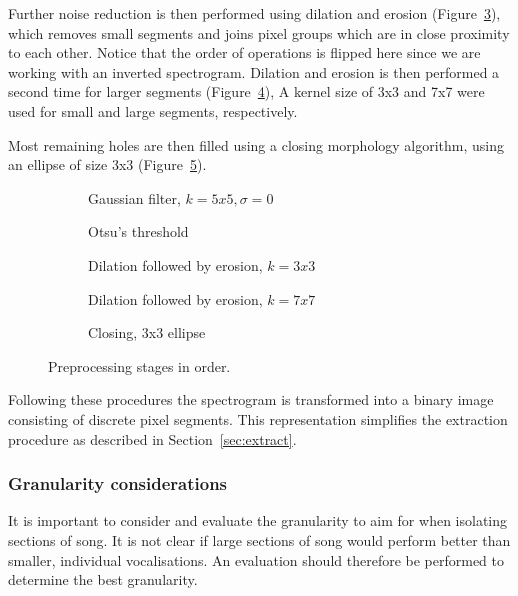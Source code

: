 Further noise reduction is then performed using dilation and erosion
(Figure~\ref{fig:preproc_vis_dilation1}),
which removes small segments and joins pixel groups which are in close proximity
to each other.
Notice that the order of operations is flipped here since we are working with
an inverted spectrogram.
Dilation and erosion is then performed a second time for larger segments
(Figure~\ref{fig:preproc_vis_dilation2}),
A kernel size of 3x3 and 7x7 were used for small and large segments, respectively.

Most remaining holes are then filled using a closing morphology algorithm,
using an ellipse of size 3x3 (Figure~\ref{fig:preproc_vis_closing}).

\begin{figure}[h]
  \centering
  \begin{subfigure}[b]{0.55\textwidth}

    \caption{Gaussian filter, $k=5x5, \sigma=0$}
    \label{fig:preproc_vis_filter}
  \end{subfigure}
  \begin{subfigure}[b]{0.55\textwidth}

    \caption{Otsu's threshold}
    \label{fig:preproc_vis_thresh}
  \end{subfigure}
  \begin{subfigure}[b]{0.55\textwidth}

    \caption{Dilation followed by erosion, $k=3x3$}
    \label{fig:preproc_vis_dilation1}
  \end{subfigure}
  \begin{subfigure}[b]{0.55\textwidth}

    \caption{Dilation followed by erosion, $k=7x7$}
    \label{fig:preproc_vis_dilation2}
  \end{subfigure}
  \begin{subfigure}[b]{0.55\textwidth}

    \caption{Closing, 3x3 ellipse}
    \label{fig:preproc_vis_closing}
  \end{subfigure}
  \caption{Preprocessing stages in order.}
  \label{fig:preproc_vis}
\end{figure}

Following these procedures the spectrogram is transformed into a binary image
consisting of discrete pixel segments.
This representation simplifies the extraction procedure as described in
Section~\ref{sec:extract}.


\subsubsection{Granularity considerations}\label{sec:granularity}
It is important to consider and evaluate the granularity to aim for when
isolating sections of song.
It is not clear if large sections of song would perform better than smaller,
individual vocalisations.
An evaluation should therefore be performed to determine the best granularity.

